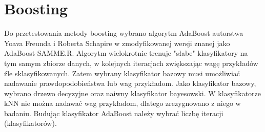 \section{Boosting}
Do przetestowania metody boosting wybrano algorytm AdaBoost autorstwa Yoava Freunda i Roberta Schapire w zmodyfikowanej wersji znanej jako AdaBoost-SAMME.R. Algorytm wielokrotnie trenuje "słabe" klasyfikatory na tym samym zbiorze danych, w kolejnych iteracjach zwiększając wagę przykładów źle sklasyfikowanych. Zatem wybrany klasyfikator bazowy musi umożliwiać nadawanie prawdopodobieństwa lub wag przykładom. Jako klasyfikator bazowy, wybrano drzewo decyzyjne oraz naiwny klasyfikator bayesowski. W klasyfikatorze kNN nie można nadawać wag przykładom, dlatego zrezygnowano z niego w badaniu. Budując klasyfikator AdaBoost należy wybrać liczbę iteracji (klasyfikatorów).

